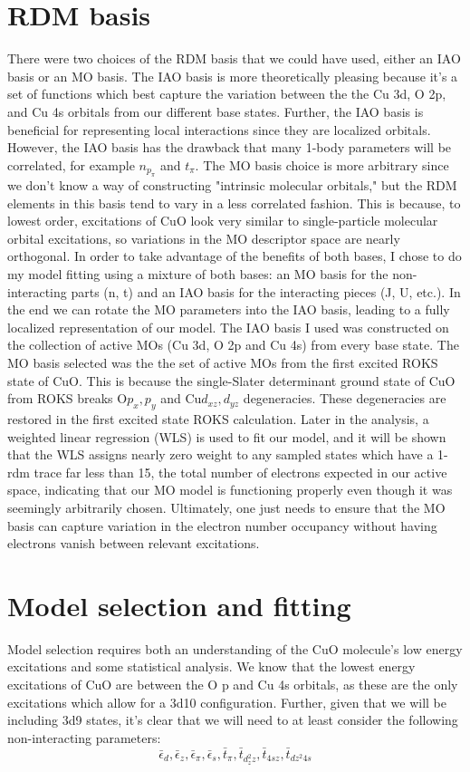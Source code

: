 \documentclass{article}
\begin{document}
\section{RDM basis}
There were two choices of the RDM basis that we could have used, either an IAO basis or an MO basis. The IAO basis is more theoretically pleasing because it's a set of functions which best capture the variation between the the Cu 3d, O 2p, and Cu 4s orbitals from our different base states. Further, the IAO basis is beneficial for representing local interactions since they are localized orbitals. However, the IAO basis has the drawback that many 1-body parameters will be correlated, for example $n_{p_\pi}$ and $t_\pi$. The MO basis choice is more arbitrary since we don't know a way of constructing "intrinsic molecular orbitals," but the RDM elements in this basis tend to vary in a less correlated fashion. This is because, to lowest order, excitations of CuO look very similar to single-particle molecular orbital excitations, so variations in the MO descriptor space are nearly orthogonal. In order to take advantage of the benefits of both bases, I chose to do my model fitting using a mixture of both bases: an MO basis for the non-interacting parts (n, t) and an IAO basis for the interacting pieces (J, U, etc.). In the end we can rotate the MO parameters into the IAO basis, leading to a fully localized representation of our model. The IAO basis I used was constructed on the collection of active MOs (Cu 3d, O 2p and Cu 4s) from every base state. The MO basis selected was the the set of active MOs from the first excited ROKS state of CuO. This is because the single-Slater determinant ground state of CuO from ROKS breaks O$p_x, p_y$ and Cu$d_{xz}, d_{yz}$ degeneracies. These degeneracies are restored in the first excited state ROKS calculation. Later in the analysis, a weighted linear regression (WLS) is used to fit our model, and it will be shown that the WLS assigns nearly zero weight to any sampled states which have a 1-rdm trace far less than 15, the total number of electrons expected in our active space, indicating that our MO model is functioning properly even though it was seemingly arbitrarily chosen. Ultimately, one just needs to ensure that the MO basis can capture variation in the electron number occupancy without having electrons vanish between relevant excitations.

\section{Model selection and fitting}
Model selection requires both an understanding of the CuO molecule's low energy excitations and some statistical analysis. We know that the lowest energy excitations of CuO are between the O p and Cu 4s orbitals, as these are the only excitations which allow for a 3d10 configuration. Further, given that we will be including 3d9 states, it's clear that we will need to at least consider the following non-interacting parameters:
$$\bar{\epsilon}_d, \bar{\epsilon}_z, \bar{\epsilon}_\pi, \bar{\epsilon}_s, \bar{t}_\pi, \bar{t}_{d_z^2 z}, \bar{t}_{4s z}, \bar{t}_{dz^2 4s}$$
\end{document}
